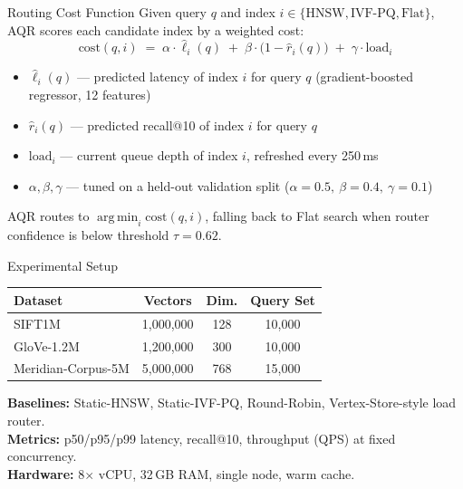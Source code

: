 \begin{frame}{Routing Cost Function}
Given query $q$ and index $i \in \{\text{HNSW}, \text{IVF-PQ}, \text{Flat}\}$, AQR scores each candidate index by a weighted cost:
\[
  \mathrm{cost}(q,i) \;=\; \alpha \cdot \widehat{\ell}_i(q) \;+\; \beta \cdot \big(1 - \widehat{r}_i(q)\big) \;+\; \gamma \cdot \mathrm{load}_i
\]
\begin{itemize}
\item $\widehat{\ell}_i(q)$ --- predicted latency of index $i$ for query $q$ (gradient-boosted regressor, 12 features)
\item $\widehat{r}_i(q)$ --- predicted recall@10 of index $i$ for query $q$
\item $\mathrm{load}_i$ --- current queue depth of index $i$, refreshed every 250\,ms
\item $\alpha,\beta,\gamma$ --- tuned on a held-out validation split ($\alpha{=}0.5,\ \beta{=}0.4,\ \gamma{=}0.1$)
\end{itemize}
AQR routes to $\operatorname*{arg\,min}_i \mathrm{cost}(q,i)$, falling back to Flat search when router confidence is below threshold $\tau = 0.62$.
\end{frame}

\begin{frame}{Experimental Setup}
\small
\renewcommand{\arraystretch}{1.2}
\begin{center}
\begin{tabular}{lccc}
\toprule
\textbf{Dataset} & \textbf{Vectors} & \textbf{Dim.} & \textbf{Query Set} \\
\midrule
SIFT1M & 1{,}000{,}000 & 128 & 10{,}000 \\
GloVe-1.2M & 1{,}200{,}000 & 300 & 10{,}000 \\
Meridian-Corpus-5M & 5{,}000{,}000 & 768 & 15{,}000 \\
\bottomrule
\end{tabular}
\end{center}
\vspace{0.2cm}
\normalsize
\textbf{Baselines:} Static-HNSW, Static-IVF-PQ, Round-Robin, Vertex-Store-style load router.\\
\textbf{Metrics:} p50/p95/p99 latency, recall@10, throughput (QPS) at fixed concurrency.\\
\textbf{Hardware:} 8$\times$ vCPU, 32\,GB RAM, single node, warm cache.
\end{frame}

